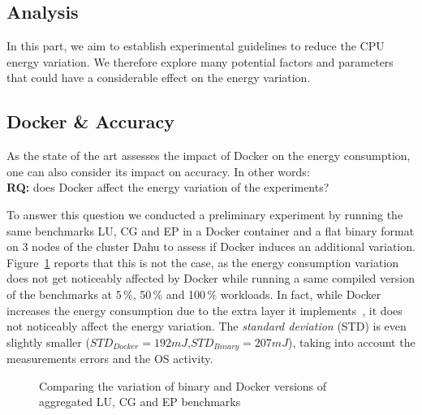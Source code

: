 \subsection{Analysis}\label{subsec:parameters}
In this part, we aim to establish experimental guidelines to reduce the CPU energy variation.
We therefore explore many potential factors and parameters that could have a considerable effect on the energy variation.

\subsection{Docker \& Accuracy}
As the state of the art assesses the impact of Docker on the energy consumption, one can also consider its impact on accuracy.
In other words:\\
\textbf{RQ:} does Docker affect the energy variation of the experiments? 

To answer this question we conducted a preliminary experiment by running the same benchmarks \textsf{LU}, \textsf{CG} and \textsf{EP} in a Docker container and a flat binary format on 3 nodes of the cluster \textsf{Dahu} to assess if Docker induces an additional variation.
Figure~\ref{fig:docker} reports that this is not the case, as the energy consumption variation does not get noticeably affected by Docker while running a same compiled version of the benchmarks at 5\,\%, 50\,\% and 100\,\% workloads.
In fact, while Docker increases the energy consumption due to the extra layer it implements~\cite{eddie_antonio_santos_how}, it does not noticeably affect the energy variation.
The \emph{standard deviation} (STD) is even slightly smaller ($STD_{Docker}=192 mJ$,$STD_{Binary}=207 mJ$), taking into account the measurements errors and the OS activity.

\begin{figure}
    \caption{Comparing the variation of binary and Docker versions of aggregated \textsf{LU}, \textsf{CG} and \textsf{EP} benchmarks}\label{fig:docker}
\end{figure}

